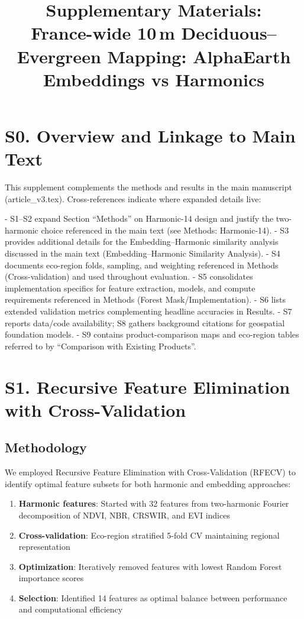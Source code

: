 \documentclass[utf8]{frontiers_suppmat}
\begin{document}
\onecolumn
{}

\title{Supplementary Materials:\\France-wide 10\,m Deciduous–Evergreen Mapping: AlphaEarth Embeddings vs Harmonics}

\maketitle

\section{S0. Overview and Linkage to Main Text}

This supplement complements the methods and results in the main manuscript (article\_v3.tex). Cross-references indicate where expanded details live:

- S1–S2 expand Section “Methods” on Harmonic-14 design and justify the two-harmonic choice referenced in the main text (see Methods: Harmonic-14).
- S3 provides additional details for the Embedding–Harmonic similarity analysis discussed in the main text (Embedding–Harmonic Similarity Analysis).
- S4 documents eco-region folds, sampling, and weighting referenced in Methods (Cross-validation) and used throughout evaluation.
- S5 consolidates implementation specifics for feature extraction, models, and compute requirements referenced in Methods (Forest Mask/Implementation).
- S6 lists extended validation metrics complementing headline accuracies in Results.
- S7 reports data/code availability; S8 gathers background citations for geospatial foundation models.
- S9 contains product-comparison maps and eco-region tables referred to by “Comparison with Existing Products”.

\section{S1. Recursive Feature Elimination with Cross-Validation}

\subsection{Methodology}
We employed Recursive Feature Elimination with Cross-Validation (RFECV) to identify optimal feature subsets for both harmonic and embedding approaches:

\begin{enumerate}
    \item \textbf{Harmonic features}: Started with 32 features from two-harmonic Fourier decomposition of NDVI, NBR, CRSWIR, and EVI indices
    \item \textbf{Cross-validation}: Eco-region stratified 5-fold CV maintaining regional representation
    \item \textbf{Optimization}: Iteratively removed features with lowest Random Forest importance scores
    \item \textbf{Selection}: Identified 14 features as optimal balance between performance and computational efficiency
\end{enumerate}
\end{document}
